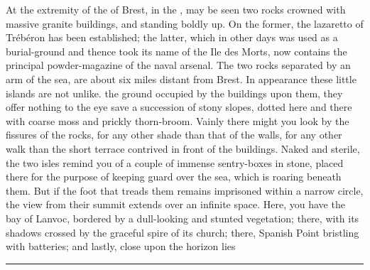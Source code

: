 \documentclass[paper=A4]{scrbook}
\begin{document}
\beginnumbering\pstart
At the extremity of the  of Brest, in the , may be seen two rocks crowned with massive granite buildings, and standing boldly up. On the former, the lazaretto of Trébéron has been established; the latter, which in other days was used as a burial-ground and thence took its name of the Ile des Morts, now contains the principal powder-magazine of the naval arsenal. The two rocks separated by an arm of the sea, are about six miles distant from Brest. In appearance these little islands are not unlike.  the ground occupied by the buildings upon them, they offer nothing to the eye save a succession of stony slopes, dotted here and there with coarse moss and prickly thorn-broom. Vainly there might you look  by the fissures of the rocks, for any other shade than that of the walls, for any other walk than the short terrace contrived in front of the buildings. Naked and sterile, the two isles remind you of a couple of immense sentry-boxes in stone, placed there for the purpose of keeping guard over the sea, which is roaring beneath them. But if the foot that treads them remains imprisoned within a narrow circle, the view from their summit extends over an infinite space. Here, you have the bay of Lanvoc, bordered by a dull-looking and stunted vegetation; there,  with its shadows crossed by the graceful spire of its church; there, Spanish Point bristling with batteries; and lastly, close upon the horizon lies 
\pend\endnumbering
\vskip 2cm
\hrule
{}
\end{document}

